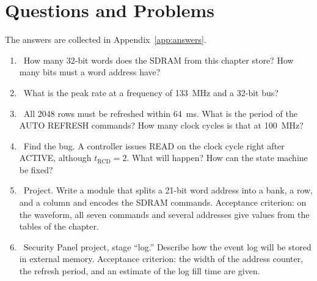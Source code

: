 \section{Questions and Problems}
\label{sec:tasks-sdram}

The answers are collected in Appendix~\ref{app:answers}.

\begin{taskbox}
\begin{enumerate}
  \item {}~How many 32-bit words does the SDRAM from this chapter store? How many bits must a word address have?
  \item {}~What is the peak rate at a frequency of 133~MHz and a 32-bit bus?
  \item {}~All 2048 rows must be refreshed within 64~ms. What is the period of the AUTO REFRESH commands? How many clock cycles is that at 100~MHz?
  \item {}~Find the bug. A controller issues READ on the clock cycle right after ACTIVE, although $t_\text{RCD}=2$.
        What will happen? How can the state machine be fixed?
  \item {}~Project. Write a module that splits a 21-bit word address into a bank, a row, and a column
        and encodes the SDRAM commands. Acceptance criterion: on the waveform, all seven commands and several addresses give
        values from the tables of the chapter.
  \item {}~Security Panel project, stage ``log.'' Describe how the event log will be stored in external
        memory. Acceptance criterion: the width of the address counter, the refresh period, and an estimate of the log fill time are given.
\end{enumerate}
\end{taskbox}

